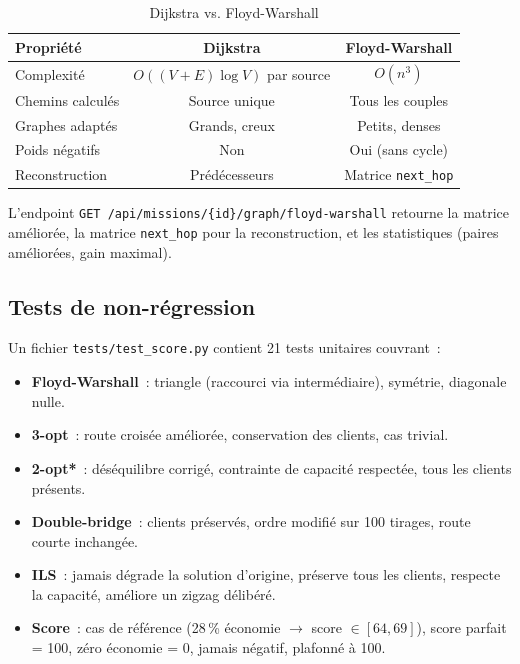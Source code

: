 \documentclass[a4paper, 12pt, twoside]{article}
\begin{document}
\begin{table}[h]
\begin{center}
\begin{tabular}{|l|c|c|}
\hline
\textbf{Propri\'{e}t\'{e}} & \textbf{Dijkstra} & \textbf{Floyd-Warshall} \\
\hline
Complexit\'{e} & $O((V+E)\log V)$ par source & $O(n^3)$ \\
\hline
Chemins calcul\'{e}s & Source unique & Tous les couples \\
\hline
Graphes adapt\'{e}s & Grands, creux & Petits, denses \\
\hline
Poids n\'{e}gatifs & Non & Oui (sans cycle) \\
\hline
Reconstruction & Pr\'{e}d\'{e}cesseurs & Matrice \texttt{next\_hop} \\
\hline
\end{tabular}
\end{center}
\caption{Dijkstra vs. Floyd-Warshall}
\label{tab:fw}
\end{table}

L'endpoint \texttt{GET /api/missions/\{id\}/graph/floyd-warshall} retourne la matrice améliorée, la matrice \texttt{next\_hop} pour la reconstruction, et les statistiques (paires améliorées, gain maximal).

\subsection{Tests de non-régression}

Un fichier \texttt{tests/test\_score.py} contient 21 tests unitaires couvrant~:

\begin{itemize}
  \item \textbf{Floyd-Warshall}~: triangle (raccourci via interm\'{e}diaire), sym\'{e}trie, diagonale nulle.
  \item \textbf{3-opt}~: route crois\'{e}e am\'{e}lior\'{e}e, conservation des clients, cas trivial.
  \item \textbf{2-opt*}~: d\'{e}s\'{e}quilibre corrig\'{e}, contrainte de capacit\'{e} respect\'{e}e, tous les clients pr\'{e}sents.
  \item \textbf{Double-bridge}~: clients pr\'{e}serv\'{e}s, ordre modifi\'{e} sur 100 tirages, route courte inchang\'{e}e.
  \item \textbf{ILS}~: jamais d\'{e}grade la solution d'origine, pr\'{e}serve tous les clients, respecte la capacit\'{e}, am\'{e}liore un zigzag d\'{e}lib\'{e}r\'{e}.
  \item \textbf{Score}~: cas de r\'{e}f\'{e}rence (28\,\% \'{e}conomie $\to$ score $\in [64, 69]$), score parfait = 100, z\'{e}ro \'{e}conomie = 0, jamais n\'{e}gatif, plafonn\'{e} \`{a} 100.
\end{itemize}
\end{document}
